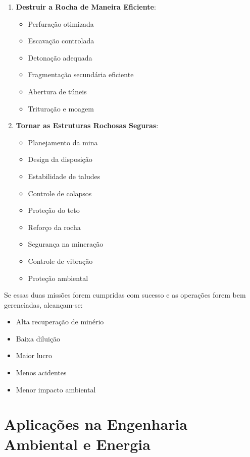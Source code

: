\documentclass[12pt,a4paper,twoside]{book}
\begin{document}
\begin{enumerate}
    \item \textbf{Destruir a Rocha de Maneira Eficiente}:
    \begin{itemize}
        \item Perfuração otimizada
        \item Escavação controlada
        \item Detonação adequada
        \item Fragmentação secundária eficiente
        \item Abertura de túneis
        \item Trituração e moagem
    \end{itemize}
    
    \item \textbf{Tornar as Estruturas Rochosas Seguras}:
    \begin{itemize}
        \item Planejamento da mina
        \item Design da disposição
        \item Estabilidade de taludes
        \item Controle de colapsos
        \item Proteção do teto
        \item Reforço da rocha
        \item Segurança na mineração
        \item Controle de vibração
        \item Proteção ambiental
    \end{itemize}
\end{enumerate}

Se essas duas missões forem cumpridas com sucesso e as operações forem bem gerenciadas, alcançam-se:
\begin{itemize}
    \item Alta recuperação de minério
    \item Baixa diluição
    \item Maior lucro
    \item Menos acidentes
    \item Menor impacto ambiental
\end{itemize}

\section{Aplicações na Engenharia Ambiental e Energia}
\end{document}
